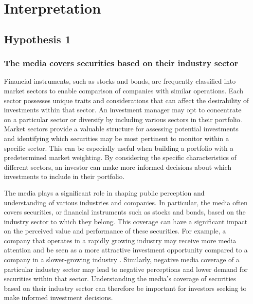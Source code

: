 \chapter{Interpretation}
\label{cha:interpretation}

\section{Hypothesis 1}
\label{cha:hypothesis-1}
\subsection{The media covers securities based on their industry sector}

Financial instruments, such as stocks and bonds, are frequently classified into market sectors to enable comparison of companies with similar operations. Each sector possesses unique traits and considerations that can affect the desirability of investments within that sector. An investment manager may opt to concentrate on a particular sector or diversify by including various sectors in their portfolio.
Market sectors provide a valuable structure for assessing potential investments and identifying which securities may be most pertinent to monitor within a specific sector. This can be especially useful when building a portfolio with a predetermined market weighting. By considering the specific characteristics of different sectors, an investor can make more informed decisions about which investments to include in their portfolio. \cite{kalyani2016stock}

The media plays a significant role in shaping public perception and understanding of various industries and companies. In particular, the media often covers securities, or financial instruments such as stocks and bonds, based on the industry sector to which they belong. This coverage can have a significant impact on the perceived value and performance of these securities. For example, a company that operates in a rapidly growing industry may receive more media attention and be seen as a more attractive investment opportunity compared to a company in a slower-growing industry \cite{MediaCov52:online}. Similarly, negative media coverage of a particular industry sector may lead to negative perceptions and lower demand for securities within that sector. Understanding the media's coverage of securities based on their industry sector can therefore be important for investors seeking to make informed investment decisions.


